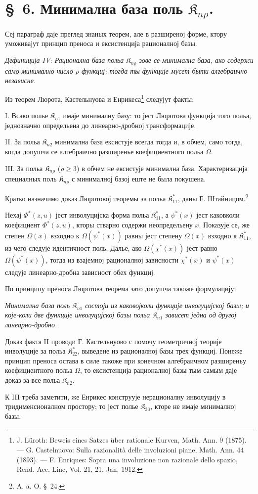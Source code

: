 ﻿\documentclass[11pt]{article}
\providecommand{\Kfield}{\mathfrak{K}}
\begin{document}
\section*{\S\ 6. Минимална база поль $\Kfield_{n\rho}$.}

Сеј параграф даје преглед знаных теорем, але в разширеној форме, ктору уможивајут принцип преноса и ексистенција рационалној базы.

{\itshape Дефиниција IV: Рационална база польа $\Kfield_{n\rho}$ зове се минимална база, ако содержи само минимално число $\rho$ функциј; тогда ты функције мусет быти алгебраично независне.}

Из теорем Люрота, Кастельнуова и Енрикеса\footnote{J. Lüroth: Beweis eines Satzes über rationale Kurven, Math. Ann. 9 (1875). --- G. Castelnuovo: Sulla razionalità delle involuzioni piane, Math. Ann. 44 (1893). --- F. Enriques: Sopra una involuzione non razionale dello spazio, Rend. Acc. Linc, Vol. 21, 21. Jan. 1912.} следујут факты:

I. Всако полье $\Kfield_{n1}$ имаје минималну базу: то јест Люротова функција того польа, једнозначно определьена до линеарно-дробној трансформације.

II. За польа $\Kfield_{n2}$ минимална база ексистује всегда тогда и, в обчем, само тогда, когда допушча се алгебраично разширенье коефициентного польа $\Omega$.

III. За польа $\Kfield_{n\rho}$ ($\rho\ge3$) в обчем не ексистује минимална база. Характеризација специалных поль $\Kfield_{n\rho}$ с минималној базој еште не была покушена.

Кратко назначимо доказ Люротовој теоремы за польа $\Kfield^*_{11}$, даны Е. Штайницом.\footnote{A. a. O. \S\ 24.}

Нехај $\Phi^*(z,u)$ јест инволуцијска форма польа $\Kfield^*_{11}$, а $\psi^*(x)$ јест каковколи коефициент $\Phi^*(z,u)$, кторы стварно содержи неопредельену $x$. Показује се, же степен $\Omega(x)$ взходно к $\Omega(\psi^*(x))$ равны јест степену $\Omega(x)$ взходно к $\Kfield^*_{11}$, из чего следује идентичност поль. Далье, ако $\Omega(\chi^*(x))$ јест равно $\Omega(\psi^*(x))$, тогда из взајемној рационалној зависности $\chi^*(x)$ и $\psi^*(x)$ следује линеарно-дробна зависност обех функциј.

По принципу преноса Люротова теорема зато допушча такоже формулацију:

{\itshape Минимална база поль $\Kfield_{n1}$ состоји из каковојколи функције инволуцијској базы; и које-коли две функције инволуцијској базы польа $\Kfield_{n1}$ зависет једна од другој линеарно-дробно.}

Доказ факта II проводи Г. Кастельнуово с помочу геометричној теорије инволуције за польа $\Kfield^*_{22}$, выведене из рационалној базы трех функциј. Понеже принцип преноса остава в силе такоже при конечном алгебраичном разширеньу коефициентного польа $\Omega$, то ексистенција рационалној базы тым самым даје доказ за все польа $\Kfield_{n2}$.

К III треба заметити, же Енрикес конструује нерационалну инволуцију в тридименсионалном простору; то јест полье $\Kfield_{33}$, кторе не имаје минималној базы.
\end{document}
